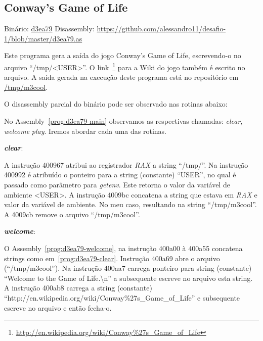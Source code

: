 \subsection{Conway's Game of Life}
Binário: \href{https://s3.amazonaws.com/chaordic-desafio-cloud/d3ea79}{d3ea79}
Disassembly: \href{https://github.com/alessandro11/desafio-1/blob/master/d3ea79.as}{https://github.com/alessandro11/desafio-1/blob/master/d3ea79.as}

Este programa gera a saída do jogo Conway's Game of Life,
escrevendo-o no arquivo ``/tmp/<USER>''. O
link~\footnote{\href{http://en.wikipedia.org/wiki/Conway\%27s\_Game\_of\_Life}{http://en.wikipedia.org/wiki/Conway\%27s\_Game\_of\_Life}}
para a Wiki do jogo também é escrito no arquivo. A saída gerada na
execução deste programa está no repositório em
\href{https://github.com/alessandro11/desafio-1/blob/master/m3cool}{/tmp/m3cool}.

O disassembly parcial do binário pode ser observado nas rotinas abaixo:



No Assembly~\ref{prog:d3ea79-main} observamos as respectivas chamadas:
\emph{clear}, \emph{welcome} \emph{play}. Iremos abordar cada uma das rotinas.\\

\par\textbf{\emph{clear}}:


A instrução 400967 atribui ao registrador \emph{RAX}
a string ``/tmp/''. Na instrução 400992 é atribuído o ponteiro para a
string (constante) ``USER'', no qual é passado como parâmetro para
\emph{getenv}. Este retorna o valor da variável de ambiente <USER>.
A instrução 4009bc concatena a string que estava em \emph{RAX} e valor da
variável de ambiente. No meu caso, resultando na string
``/tmp/m3cool''. A 4009cb remove o arquivo ``/tmp/m3cool''.\\

\par\textbf{\emph{welcome}}:


O Assembly~\ref{prog:d3ea79-welcome}, na instrução 400a00 à 400a55
concatena strings como em~\ref{prog:d3ea79-clear}. Instrução 400a69
abre o arquivo (``/tmp/m3cool''). Na instrução 400aa7 carrega ponteiro
para string (constante) ``Welcome to the Game of Life.\textbackslash n'' a
subsequente escreve no arquivo esta string. A instrução 400ab8 carrega a
string (constante) ``http://en.wikipedia.org/wiki/Conway\%27s\_Game\_of\_Life'' e
subsequente escreve no arquivo e então fecha-o.\\

